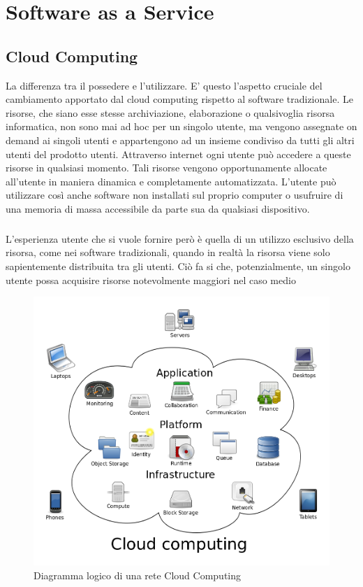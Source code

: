 \chapter{Software as a Service}

\section{Cloud Computing}
La differenza tra il possedere e l'utilizzare. E' questo l'aspetto cruciale del cambiamento apportato dal cloud computing rispetto al software tradizionale. Le risorse, che siano esse stesse archiviazione, elaborazione o qualsivoglia risorsa informatica, non sono mai ad hoc per un singolo utente, ma vengono assegnate on demand ai singoli utenti e appartengono ad un insieme condiviso da tutti gli altri utenti del prodotto utenti. Attraverso internet ogni utente può accedere a queste risorse in qualsiasi momento. Tali risorse vengono opportunamente allocate all'utente in maniera dinamica e completamente automatizzata. L'utente può utilizzare così anche software non installati sul proprio computer o usufruire di una memoria di massa accessibile da parte sua da qualsiasi dispositivo.
\paragraph{}
L'esperienza utente che si vuole fornire però è quella di un utilizzo esclusivo della risorsa, come nei software tradizionali, quando in realtà la risorsa viene solo sapientemente distribuita tra gli utenti. Ciò fa si che, potenzialmente, un singolo utente possa acquisire risorse notevolmente maggiori nel caso medio
\begin{figure}
	\centering
	\includegraphics[width=0.7\linewidth]{capitoli/imgs/CloudComputing}
	\caption{Diagramma logico di una rete Cloud Computing}
	\label{fig:cloudcomputing}
\end{figure}
